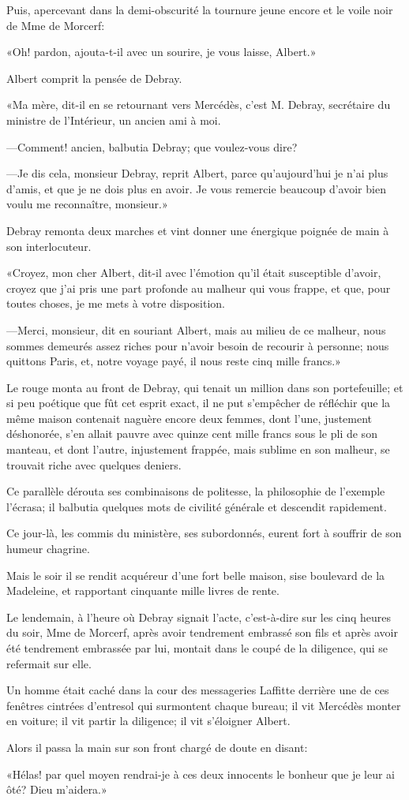 Puis, apercevant dans la demi-obscurité la tournure jeune encore et le voile noir de Mme de Morcerf: 

«Oh! pardon, ajouta-t-il avec un sourire, je vous laisse, Albert.» 

Albert comprit la pensée de Debray. 

«Ma mère, dit-il en se retournant vers Mercédès, c'est M. Debray, secrétaire du ministre de l'Intérieur, un ancien ami à moi. 

—Comment! ancien, balbutia Debray; que voulez-vous dire? 

—Je dis cela, monsieur Debray, reprit Albert, parce qu'aujourd'hui je n'ai plus d'amis, et que je ne dois plus en avoir. Je vous remercie beaucoup d'avoir bien voulu me reconnaître, monsieur.» 

Debray remonta deux marches et vint donner une énergique poignée de main à son interlocuteur. 

«Croyez, mon cher Albert, dit-il avec l'émotion qu'il était susceptible d'avoir, croyez que j'ai pris une part profonde au malheur qui vous frappe, et que, pour toutes choses, je me mets à votre disposition. 

—Merci, monsieur, dit en souriant Albert, mais au milieu de ce malheur, nous sommes demeurés assez riches pour n'avoir besoin de recourir à personne; nous quittons Paris, et, notre voyage payé, il nous reste cinq mille francs.» 

Le rouge monta au front de Debray, qui tenait un million dans son portefeuille; et si peu poétique que fût cet esprit exact, il ne put s'empêcher de réfléchir que la même maison contenait naguère encore deux femmes, dont l'une, justement déshonorée, s'en allait pauvre avec quinze cent mille francs sous le pli de son manteau, et dont l'autre, injustement frappée, mais sublime en son malheur, se trouvait riche avec quelques deniers. 

Ce parallèle dérouta ses combinaisons de politesse, la philosophie de l'exemple l'écrasa; il balbutia quelques mots de civilité générale et descendit rapidement. 

Ce jour-là, les commis du ministère, ses subordonnés, eurent fort à souffrir de son humeur chagrine. 

Mais le soir il se rendit acquéreur d'une fort belle maison, sise boulevard de la Madeleine, et rapportant cinquante mille livres de rente. 

Le lendemain, à l'heure où Debray signait l'acte, c'est-à-dire sur les cinq heures du soir, Mme de Morcerf, après avoir tendrement embrassé son fils et après avoir été tendrement embrassée par lui, montait dans le coupé de la diligence, qui se refermait sur elle. 

Un homme était caché dans la cour des messageries Laffitte derrière une de ces fenêtres cintrées d'entresol qui surmontent chaque bureau; il vit Mercédès monter en voiture; il vit partir la diligence; il vit s'éloigner Albert. 

Alors il passa la main sur son front chargé de doute en disant: 

«Hélas! par quel moyen rendrai-je à ces deux innocents le bonheur que je leur ai ôté? Dieu m'aidera.» 